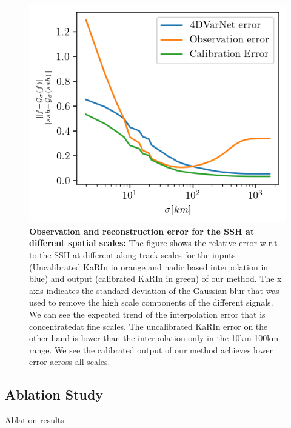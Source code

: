 \begin{bibunit}
\begin{figure}[!t]
    \centering
    \includegraphics[width=\linewidth]
    {00_Calib/norm_cumsum_highpass_errors_1.png}%
    \caption{{\bf Observation and reconstruction error for the SSH at different spatial scales:}  The figure shows the relative error w.r.t to the SSH at different along-track scales for the inputs (Uncalibrated KaRIn in orange and nadir based interpolation in blue) and output (calibrated KaRIn in green) of our method. The x axis indicates the standard deviation of the Gaussian blur that was used to remove the high scale components of the different signals. We can see the expected trend of the interpolation error that is concentratedat fine scales. The uncalibrated KaRIn  error on the other hand is lower than the interpolation only in the 10km-100km range. We see the calibrated output of our method achieves lower error across all scales.}
    \label{c3fig:err_scales}%
\end{figure}


\subsection{Ablation Study}
\label{c3subsec:ablation}
\noindent

\begin{table}[t]
\begin{center}

\end{center}
\label{c3table:ablation}
\caption{Ablation results}
\end{table}



\end{bibunit}
